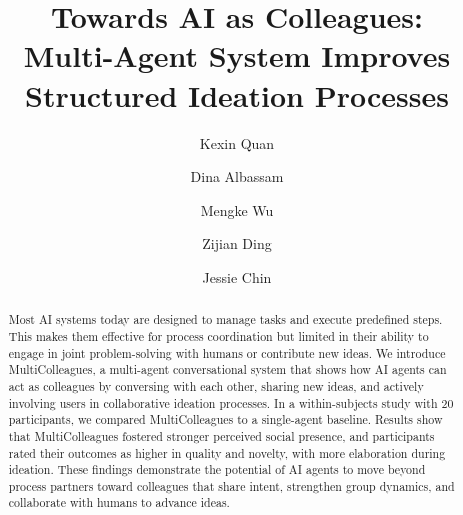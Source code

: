 \documentclass[sigconf]{acmart}
\begin{document}
\title[Towards AI as Colleagues: Multi-Agent System Improves Structured Ideation Processes]{Towards AI as Colleagues:  \\ Multi-Agent System Improves Structured Ideation Processes}

\author{Kexin Quan}

\author{Dina Albassam}

\author{Mengke Wu}
\authornotemark[1]


\author{Zijian Ding}

\author{Jessie Chin}

\renewcommand{\shortauthors}{Quan, et al.}


\begin{abstract}
Most AI systems today are designed to manage tasks and execute predefined steps. This makes them effective for process coordination but limited in their ability to engage in joint problem-solving with humans or contribute new ideas. We introduce MultiColleagues, a multi-agent conversational system that shows how AI agents can act as colleagues by conversing with each other, sharing new ideas, and actively involving users in collaborative ideation processes. In a within-subjects study with 20 participants, we compared MultiColleagues to a single-agent baseline. Results show that MultiColleagues fostered stronger perceived social presence, and participants rated their outcomes as higher in quality and novelty, with more elaboration during ideation. These findings demonstrate the potential of AI agents to move beyond process partners toward colleagues that share intent, strengthen group dynamics, and collaborate with humans to advance ideas.
\end{abstract}
\end{document}
